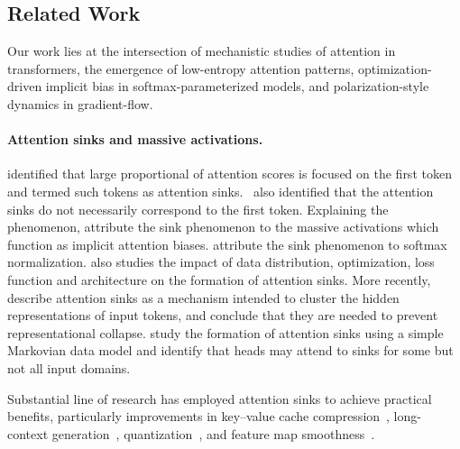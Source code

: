 \documentclass{article}
\theoremstyle{plain}
\theoremstyle{definition}
\theoremstyle{remark}
\begin{document}
\subsection{Related Work}

Our work lies at the intersection of mechanistic studies of attention in transformers, the emergence of low-entropy attention patterns, optimization-driven implicit bias in softmax-parameterized models, and polarization-style dynamics in gradient-flow.

\paragraph{Attention sinks and massive activations.}
\citet{xiao2024efficient} identified that large proportional of attention scores is focused on the first token and termed such tokens as attention sinks.~\citet{yu2024unveiling,sun2024massive} also identified that the attention sinks do not necessarily correspond to the first token. Explaining the phenomenon,
\citet{sun2024massive} attribute the sink phenomenon to the massive activations which function as implicit attention biases. \citet{xiao2024efficient,gu2025attention} attribute the sink phenomenon to softmax normalization. \citet{gu2025attention} also studies the impact of data distribution, optimization, loss function and architecture on the formation of attention sinks. More recently, \citet{zhang2025attention} describe %
attention sinks as a mechanism intended to cluster the hidden representations of input tokens, and \citet{barbero2025llms} conclude that they are needed to prevent representational collapse.
\citet{guo2024active} study the formation of attention sinks using a simple Markovian data model and identify that heads may attend to sinks for some but not all input domains.

Substantial line of research has employed attention sinks to achieve practical benefits, particularly improvements in
key–value cache compression~\citep{guo-etal-2024-attention}, long-context generation~\citep{xiao2024efficient,Yang_2025_ICCV}, quantization~\citep{son-etal-2024-prefixing}, and feature map smoothness~\citep{darcet2024vision}.
\end{document}
